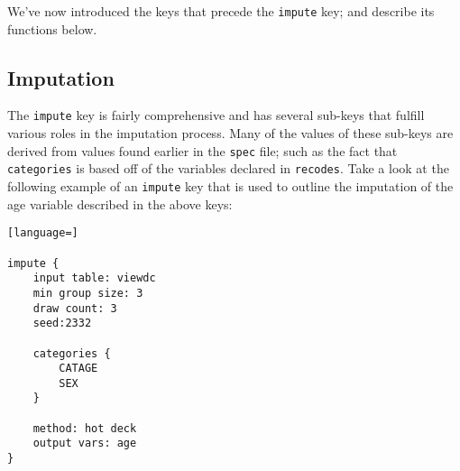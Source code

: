 \documentclass{article}
\begin{document}
We've now introduced the keys that precede the {\tt impute} key; and describe its functions below.


\subsection{Imputation} \label{imputesec}
The {\tt impute} key is fairly comprehensive and has several sub-keys that fulfill various 
roles in the imputation process. Many of the values of these sub-keys are derived from values 
found earlier in the {\tt spec} file; such as the fact that {\tt categories} is based off of 
the variables declared in {\tt recodes}. Take a look at the following example of an {\tt impute} key 
that is used to outline the imputation of the age variable described in the above keys:

\begin{lstlisting}[language=]

impute {
    input table: viewdc
    min group size: 3
    draw count: 3
    seed:2332

    categories {
        CATAGE
        SEX
    }

    method: hot deck
    output vars: age
}


\end{lstlisting}
\end{document}
